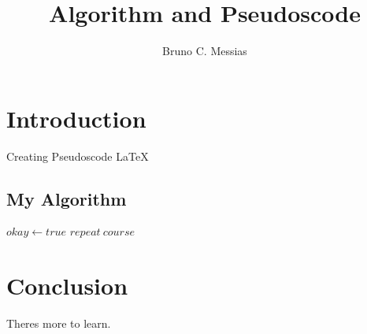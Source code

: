 \documentclass{article}
\title{Algorithm and Pseudoscode}
\author{Bruno C. Messias}
\date{}
\begin{document}
\maketitle

\section{Introduction}

Creating Pseudoscode \LaTeX

\subsection{My Algorithm}

\begin{algorithmic}

        \State $okay \gets true $
    \Else
            \State $repeat~course$
        \EndWhile
    \EndIf

\end{algorithmic}

\section{Conclusion}

Theres more to learn.
\end{document}

